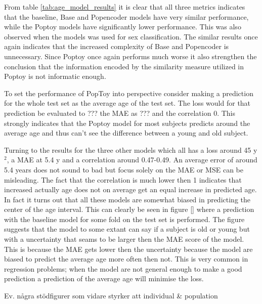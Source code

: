 From table \ref{tab:age_model_results} it is clear that all three metrics indicates that the baseline, Base and Popencoder models have very similar performance, while the Poptoy models have significantly lower performance. This was also observed when the models was used for sex classification. The similar results once again indicates that the increased complexity of Base and Popencoder is unnecessary.  Since Poptoy once again performs much worse it also strengthen the conclusion that the information encoded by the similarity measure utilized in Poptoy is not informatic enough. 

To set the performance of PopToy into perspective consider making a prediction for the whole test set as the average age of the test set. The loss would for that prediction be evaluated to ??? the MAE as ??? and the correlation 0. This strongly indicates that the Poptoy model for most subjects predicts around the average age and thus can't see the difference between a young and old subject. 

Turning to the results for the three other models which all has a loss around 45 y$^2$, a MAE at 5.4 y and a correlation around 0.47-0.49. An average error of around 5.4 years does not sound to bad but focus solely on the MAE or MSE can be misleading. The fact that the correlation is much lower then 1 indicates that increased actually age does not on average get an equal increase in predicted age. In fact it turns out that all these models are somewhat biased in predicting the center of the age interval. This can clearly be seen in figure \ref{} where a prediction with the baseline model for some fold on the test set is performed. The figure suggests that the model to some extant can say if a subject is old or young but with a uncertainty that seams to be larger then the MAE score of the model. This is because the MAE gets lower then the uncertainty because the model are biased to predict the average age more often then not. 
This is very common in regression problems; when the model are not general enough to make a good prediction a prediction of the average age will minimise the loss.   


Ev. några stödfigurer som vidare styrker att individual \& population 


